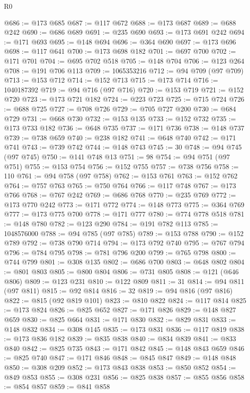 \begin{lexlean}{R0}
\begin{coremodule}
@686 := @173 @685
@687 := @117 @672
@688 := @173 @687
@689 := @688 @242
@690 := @686 @689
@691 := @235 @690
@693 := @173 @691 @242
@694 := @171 @693
@695 := @148 @694
@696 := @364 @690
@697 := @173 @696
@698 := @117 @641
@700 := @173 @698 @182
@701 := @697 @700
@702 := @171 @701
@704 := @695 @702 @518
@705 := @148 @704
@706 := @123 @264
@708 := @191 @706 @113
@709 := 1065353216
@712 := @94 @709 (@97 @709)
@713 := @153 @712
@714 := @152 @713
@715 := @173 @714
@716 := 1040187392
@719 := @94 @716 (@97 @716)
@720 := @153 @719
@721 := @152 @720
@723 := @173 @721 @182
@724 := @223 @723
@725 := @715 @724
@726 := @688 @725
@727 := @708 @726
@729 := @705 @727 @200
@730 := @684 @729
@731 := @668 @730
@732 := @153 @135
@733 := @152 @732
@735 := @173 @733 @182
@736 := @648 @735
@737 := @171 @736
@738 := @148 @737
@739 := @738 @659
@740 := @238 @182
@741 := @648 @740
@742 := @171 @741
@743 := @739 @742
@744 := @148 @743
@745 := 30
@748 := @94 @745 (@97 @745)
@750 := @141 @748 @13
@751 := 98
@754 := @94 @751 (@97 @751)
@755 := @153 @754
@756 := @152 @755
@757 := @738 @756
@758 := 110
@761 := @94 @758 (@97 @758)
@762 := @153 @761
@763 := @152 @762
@764 := @757 @763
@765 := @750 @764
@766 := @117 @748
@767 := @173 @766
@768 := @767 @242
@769 := @686 @768
@770 := @235 @769
@772 := @173 @770 @242
@773 := @171 @772
@774 := @148 @773
@775 := @364 @769
@777 := @173 @775 @700
@778 := @171 @777
@780 := @774 @778 @518
@781 := @148 @780
@782 := @123 @290
@784 := @191 @782 @113
@785 := 1048576000
@788 := @94 @785 (@97 @785)
@789 := @153 @788
@790 := @152 @789
@792 := @738 @790 @714
@794 := @173 @792 @740
@795 := @767 @794
@796 := @784 @795
@798 := @781 @796 @200
@799 := @765 @798
@800 := @744 @799
@801 := @308 @135
@802 := @686 @700
@803 := @648 @802
@804 := @801 @803
@805 := @800 @804
@806 := @731 @805
@808 := @121 (@646 @806)
@809 := @123 @231
@810 := @122 @809
@811 := 31
@814 := @94 @811 (@97 @811)
@815 := @92 @814
@816 := 32
@819 := @94 @816 (@97 @816)
@822 := @815 (@92 @819 @101)
@823 := @810 @822
@824 := @117 @814
@825 := @173 @824
@826 := @825 @652
@827 := @171 @826
@829 := @148 @827 @659
@830 := @825 @664
@831 := @171 @830
@832 := @829 @831
@833 := @148 @832
@834 := @308 @145
@835 := @173 @831
@836 := @117 @819
@838 := @173 @836 @182
@839 := @835 @838
@840 := @834 @839
@841 := @833 @840
@842 := @825 @735
@843 := @171 @842
@845 := @148 @843 @659
@846 := @825 @740
@847 := @171 @846
@848 := @845 @847
@849 := @148 @848
@850 := @308 @209
@852 := @173 @843 @838
@853 := @850 @852
@854 := @849 @853
@855 := @308 @231
@856 := @825 @838
@857 := @855 @856
@858 := @854 @857
@859 := @841 @858

\end{coremodule}
\end{lexlean}
